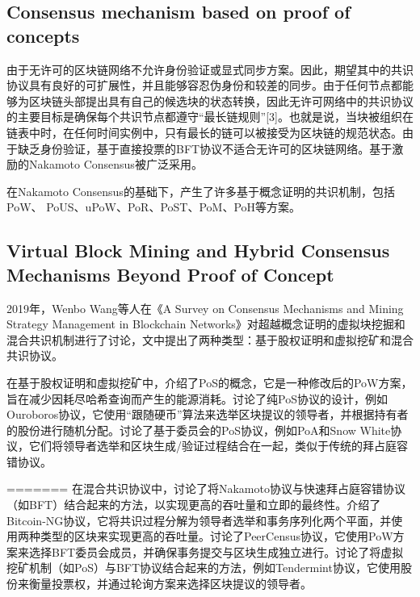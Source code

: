\documentclass[a4paper,twoside]{scrbook}
\begin{document}
\begin{CJK}{UTF8}{gbsn}
\subsection{Consensus mechanism based on proof of concepts}
由于无许可的区块链网络不允许身份验证或显式同步方案。因此，期望其中的共识协议具有良好的可扩展性，并且能够容忍伪身份和较差的同步。由于任何节点都能够为区块链头部提出具有自己的候选块的状态转换，因此无许可网络中的共识协议的主要目标是确保每个共识节点都遵守“最长链规则”[3]。也就是说，当块被组织在链表中时，在任何时间实例中，只有最长的链可以被接受为区块链的规范状态。由于缺乏身份验证，基于直接投票的BFT协议不适合无许可的区块链网络。基于激励的Nakamoto Consensus\cite{nakamoto2008bitcoin}被广泛采用。

在Nakamoto Consensus的基础下，产生了许多基于概念证明的共识机制，包括PoW、
PoUS、uPoW、PoR、PoST、PoM、PoH等方案。

\subsection{Virtual Block Mining and Hybrid Consensus Mechanisms Beyond Proof of Concept}
2019年，Wenbo Wang等人在《A Survey on Consensus Mechanisms and Mining Strategy Management in Blockchain Networks》\cite{wang2019survey}对超越概念证明的虚拟块挖掘和混合共识机制进行了讨论，文中提出了两种类型：基于股权证明和虚拟挖矿和混合共识协议。

在基于股权证明和虚拟挖矿中，介绍了PoS的概念，它是一种修改后的PoW方案，旨在减少因耗尽哈希查询而产生的能源消耗。讨论了纯PoS协议的设计，例如Ouroboros协议，它使用“跟随硬币”算法来选举区块提议的领导者，并根据持有者的股份进行随机分配。讨论了基于委员会的PoS协议，例如PoA和Snow White协议，它们将领导者选举和区块生成/验证过程结合在一起，类似于传统的拜占庭容错协议。

=======
在混合共识协议中，讨论了将Nakamoto协议与快速拜占庭容错协议（如BFT）结合起来的方法，以实现更高的吞吐量和立即的最终性。介绍了Bitcoin-NG协议，它将共识过程分解为领导者选举和事务序列化两个平面，并使用两种类型的区块来实现更高的吞吐量。讨论了PeerCensus协议，它使用PoW方案来选择BFT委员会成员，并确保事务提交与区块生成独立进行。讨论了将虚拟挖矿机制（如PoS）与BFT协议结合起来的方法，例如Tendermint协议，它使用股份来衡量投票权，并通过轮询方案来选择区块提议的领导者。
\printbibliography
\end{CJK}
\end{document}
